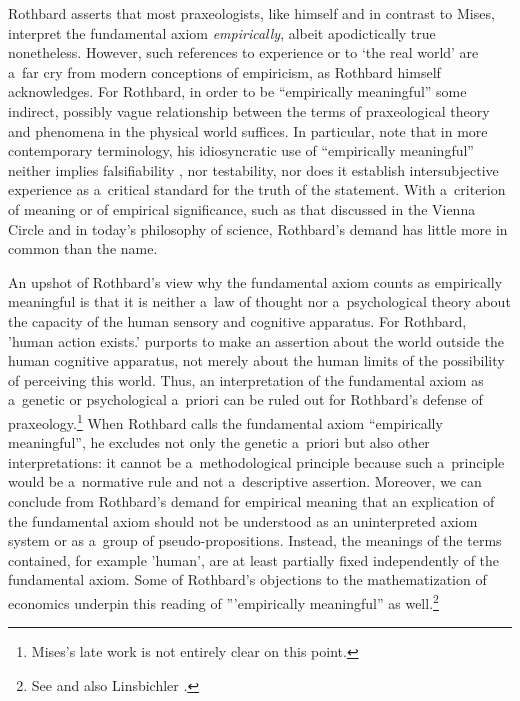 Rothbard 
\parencite*[][pp.33–34]{rothbard_praxeology_2011} %
 asserts that most praxeologists, like himself and in contrast to Mises, interpret the fundamental axiom \textit{empirically}, albeit apodictically true nonetheless. However, such references to experience or to ‘the real world' are a~far cry from modern conceptions of empiricism, as Rothbard 
\parencite*[][p.318]{rothbard_defense_1957} %
 himself acknowledges. For Rothbard, in order to be ``empirically meaningful'' some indirect, possibly vague relationship between the terms of praxeological theory and phenomena in the physical world suffices. In particular, note that in more contemporary terminology, his idiosyncratic use of ``empirically meaningful'' neither implies falsifiability 
\parencite[][p.25]{rothbard_praxeology:_1976}, %
 nor testability, nor does it establish intersubjective experience as a~critical standard for the truth of the statement. With a~criterion of meaning or of empirical significance, such as that discussed in the Vienna Circle and in today's philosophy of science, Rothbard's demand has little more in common than the name.



An upshot of Rothbard's view why the fundamental axiom counts as empirically meaningful is that it is neither a~law of thought nor a~psychological theory about the capacity of the human sensory and cognitive apparatus. For Rothbard, 'human action exists.' purports to make an assertion about the world outside the human cognitive apparatus, not merely about the human limits of the possibility of perceiving this world. Thus, an interpretation of the fundamental axiom as a~genetic or psychological a~priori can be ruled out for Rothbard's defense of praxeology.\footnote{Mises's late work 
\parencites[][]{mises_ultimate_1962}[][]{mises_ultimate_2012} %
 is not entirely clear on this point.} When Rothbard calls the fundamental axiom ``empirically meaningful'', he excludes not only the genetic a~priori but also other interpretations: it cannot be a~methodological principle because such a~principle would be a~normative rule and not a~descriptive assertion. Moreover, we can conclude from Rothbard's demand for empirical meaning that an explication of the fundamental axiom should not be understood as an uninterpreted axiom system or as a~group of pseudo-propositions. Instead, the meanings of the terms contained, for example 'human', are at least partially fixed independently of the fundamental axiom. Some of Rothbard's objections to the mathematization of economics underpin this reading of '''empirically meaningful'' as well.\footnote{See 
\parencite[][pp.21–24]{rothbard_praxeology:_1976} %
 and also Linsbichler 
\parencites*[][]{linsbichler_sprachgeist_2021}[][]{linsbichler_case_2023}. %
 }



